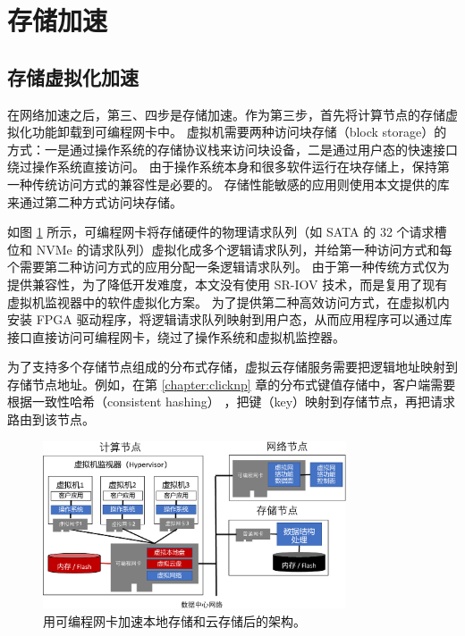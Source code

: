 \section{存储加速}

\subsection{存储虚拟化加速}

在网络加速之后，第三、四步是存储加速。作为第三步，首先将计算节点的存储虚拟化功能卸载到可编程网卡中。
虚拟机需要两种访问块存储（block storage）的方式：一是通过操作系统的存储协议栈来访问块设备，二是通过用户态的快速接口绕过操作系统直接访问。
由于操作系统本身和很多软件运行在块存储上，保持第一种传统访问方式的兼容性是必要的。
存储性能敏感的应用则使用本文提供的库来通过第二种方式访问块存储。

如图 \ref{arch:fig:virt-storage} 所示，可编程网卡将存储硬件的物理请求队列（如 SATA 的 32 个请求槽位和 NVMe 的请求队列）虚拟化成多个逻辑请求队列，并给第一种访问方式和每个需要第二种访问方式的应用分配一条逻辑请求队列。
由于第一种传统方式仅为提供兼容性，为了降低开发难度，本文没有使用 SR-IOV 技术，而是复用了现有虚拟机监视器中的软件虚拟化方案。
为了提供第二种高效访问方式，在虚拟机内安装 FPGA 驱动程序，将逻辑请求队列映射到用户态，从而应用程序可以通过库接口直接访问可编程网卡，绕过了操作系统和虚拟机监控器。

为了支持多个存储节点组成的分布式存储，虚拟云存储服务需要把逻辑地址映射到存储节点地址。例如，在第 \ref{chapter:clicknp} 章的分布式键值存储中，客户端需要根据一致性哈希（consistent hashing） \cite{nishtala2013scaling}，把键（key）映射到存储节点，再把请求路由到该节点。

\begin{figure}[htbp]
	\centering
	\includegraphics[width=0.8\textwidth]{figures/virt_storage.pdf}
	\caption{用可编程网卡加速本地存储和云存储后的架构。}
	\label{arch:fig:virt-storage}
\end{figure}

